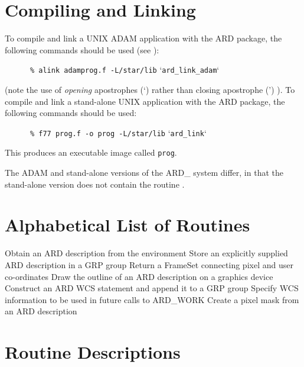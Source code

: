 \section{Compiling and Linking}

To compile and link a UNIX ADAM application with the ARD package, the following
commands should be used (see ): 

\small
\verb#      % alink adamprog.f -L/star/lib# `\verb#ard_link_adam#`
\normalsize

(note the use of {\em opening} apostrophes (`) rather than 
closing apostrophe (') ). To compile and link a stand-alone UNIX application with
the ARD package, the following commands should be used: 

\small
\verb#      % f77 prog.f -o prog -L/star/lib# `\verb#ard_link#`
\normalsize

This produces an executable image called \verb+prog+.

The ADAM and stand-alone versions of the ARD\_ system differ, in that the
stand-alone version does not contain the routine .

\appendix
\section{Alphabetical List of Routines}


            {Obtain an ARD description from the environment}
            {Store an explicitly supplied ARD description in a GRP group}
            {Return a FrameSet connecting pixel and user co-ordinates}
            {Draw the outline of an ARD description on a graphics device}
            {Construct an ARD WCS statement and append it to a GRP group}
            {Specify WCS information to be used in future calls to ARD\_WORK}
            {Create a pixel mask from an ARD description}

\newpage
\section{\label{APP:SPEC}Routine Descriptions}


